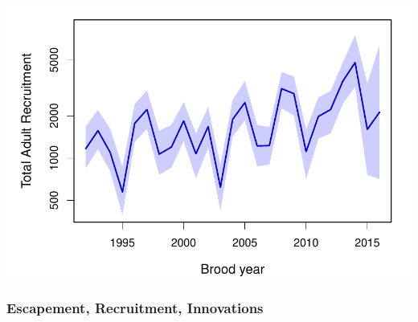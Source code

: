\documentclass[
  11pt,
]{article}
\begin{document}
\includegraphics{App_2_Summarize_results_Spring_Chinook_files/figure-latex/plot_recruitment-1.pdf}

\hypertarget{escapement-recruitment-innovations}{%
\subsubsection{Escapement, Recruitment,
Innovations}\label{escapement-recruitment-innovations}}
\end{document}
